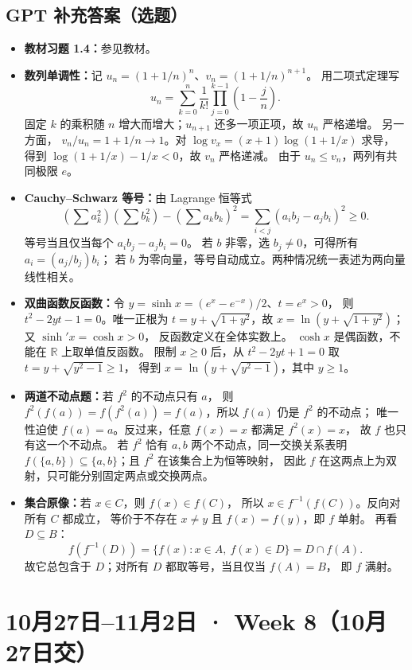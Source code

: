 \documentclass[UTF8,11pt, a4paper, oneside, fontset=none]{ctexbook}
\begin{document}
\subsection*{GPT 补充答案（选题）}
\begin{itemize}
\item \textbf{教材习题 1.4：}参见教材。
\item \textbf{数列单调性：}记 $u_n=(1+1/n)^n$、$v_n=(1+1/n)^{n+1}$。
用二项式定理写
\[
u_n=\sum_{k=0}^n\frac1{k!}\prod_{j=0}^{k-1}\left(1-\frac jn\right).
\]
固定 $k$ 的乘积随 $n$ 增大而增大；$u_{n+1}$ 还多一项正项，故 $u_n$ 严格递增。
另一方面，
$v_n/u_n=1+1/n\to1$。对
$\log v_x=(x+1)\log(1+1/x)$ 求导，
得到 $\log(1+1/x)-1/x<0$，故 $v_n$ 严格递减。
由于 $u_n\le v_n$，两列有共同极限 $e$。
\item \textbf{Cauchy--Schwarz 等号：}由 Lagrange 恒等式
\[
\left(\sum a_k^2\right)\left(\sum b_k^2\right)
-\left(\sum a_kb_k\right)^2
=\sum_{i<j}(a_ib_j-a_jb_i)^2\ge0.
\]
等号当且仅当每个 $a_ib_j-a_jb_i=0$。
若 $b$ 非零，选 $b_j\ne0$，可得所有 $a_i=(a_j/b_j)b_i$；
若 $b$ 为零向量，等号自动成立。两种情况统一表述为两向量线性相关。
\item \textbf{双曲函数反函数：}令 $y=\sinh x=(e^x-e^{-x})/2$、$t=e^x>0$，
则 $t^2-2yt-1=0$。唯一正根为 $t=y+\sqrt{1+y^2}$，故
$x=\ln(y+\sqrt{1+y^2})$；又 $\sinh' x=\cosh x>0$，
反函数定义在全体实数上。
$\cosh x$ 是偶函数，不能在 $\mathbb R$ 上取单值反函数。
限制 $x\ge0$ 后，从 $t^2-2yt+1=0$ 取 $t=y+\sqrt{y^2-1}\ge1$，
得到 $x=\ln(y+\sqrt{y^2-1})$，其中 $y\ge1$。
\item \textbf{两道不动点题：}若 $f^2$ 的不动点只有 $a$，
则 $f^2(f(a))=f(f^2(a))=f(a)$，所以 $f(a)$ 仍是 $f^2$ 的不动点；
唯一性迫使 $f(a)=a$。反过来，任意 $f(x)=x$ 都满足 $f^2(x)=x$，
故 $f$ 也只有这一个不动点。
若 $f^2$ 恰有 $a,b$ 两个不动点，同一交换关系表明
$f(\{a,b\})\subseteq\{a,b\}$；且 $f^2$ 在该集合上为恒等映射，
因此 $f$ 在这两点上为双射，只可能分别固定两点或交换两点。
\item \textbf{集合原像：}若 $x\in C$，则 $f(x)\in f(C)$，
所以 $x\in f^{-1}(f(C))$。反向对所有 $C$ 都成立，
等价于不存在 $x\ne y$ 且 $f(x)=f(y)$，即 $f$ 单射。
再看 $D\subseteq B$：
\[
f(f^{-1}(D))=\{f(x):x\in A,\ f(x)\in D\}=D\cap f(A).
\]
故它总包含于 $D$；对所有 $D$ 都取等号，当且仅当 $f(A)=B$，
即 $f$ 满射。
\end{itemize}
\clearpage
\section{10月27日--11月2日 · Week 8（10月27日交）}
\end{document}
